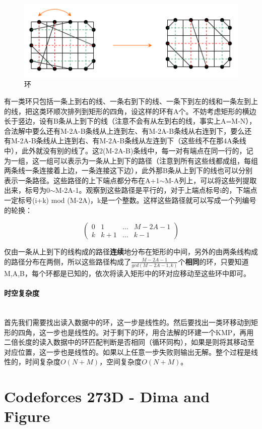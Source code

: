 \documentclass[UTF8]{ctexart}
\newcommand{\myparagraph}[1]{\paragraph{#1}\mbox{}\\}
\theoremstyle{nonumberplain}
\begin{document}
			\begin{figure}[ht]
				\centering
				\includegraphics[width=\textwidth]{fig269e_1.jpg}
				\caption{环}
			\end{figure}
			
			有一类环只包括一条上到右的线、一条右到下的线、一条下到左的线和一条左到上的线，把这类环顺次排列到矩形的四角，设这样的环有A个。不妨考虑矩形的横边长于竖边，设有B条从上到下的线（注意不会有从左到右的线，事实上A=M-N），合法解中要么还有M-2A-B条线从上连到左、有M-2A-B条线从右连到下，要么还有M-2A-B条线从上连到右、有M-2A-B条线从左连到下（这些线不在那4A条线中），此外就没有别的线了。这2(M-2A-B)条线中，每一对有端点在同一行的，记为一组，这一组可以表示为一条从上到下的路径（注意到所有这些线都成组，每组两条线一条连接着上边，一条连接这下边），此外那B条从上到下的线也可以分别表示一条路径。这些路径的上下端点都分布在A+1$\sim$M-A列上，可以将这些列提取出来，标号为0$\sim$M-2A-1。观察到这些路径是平行的，对于上端点标号i的，下端点一定标号(i+k) mod (M-2A)，k是一个整数。这样这些路径就可以写成一个列编号的轮换：
			
			$$\begin{pmatrix} 0 & 1 & ... & M-2A-1 \\ k & k+1 & ... & k-1 \end{pmatrix}$$
			
			仅由一条从上到下的线构成的路径\textbf{连续}地分布在矩形的中间，另外的由两条线构成的路径分布在两侧，所以这些路径构成了$\frac{M-2A-1}{gcd(M-2A-1,k)}$个\textbf{相同}的环，只要知道M,A,B，每个环都是已知的，依次将读入矩形中的环对应移动至这些环中即可。
		
		\myparagraph{时空复杂度}
		
			首先我们需要找出读入数据中的环，这一步是线性的。然后要找出一类环移动到矩形的四角，这一步也是线性的。对于剩下的环，用合法解的环建一个KMP，再用二倍长度的读入数据中的环匹配判断是否相同（循环同构），如果是则将其移动至对应位置，这一步也是线性的。如果以上任意一步失败则输出无解。整个过程是线性的，时间复杂度$O(N+M)$，空间复杂度$O(N+M)$。
	
	\section{Codeforces 273D - Dima and Figure}
	
\end{document}
